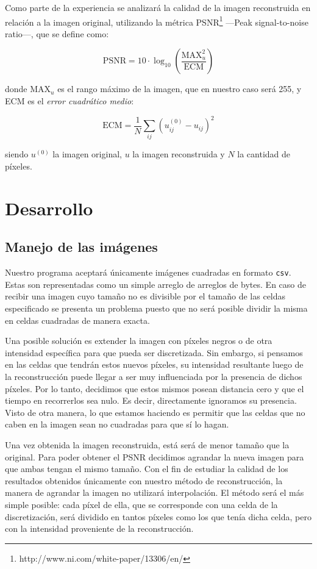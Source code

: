 \documentclass[a4paper]{article}
\begin{document}
Como parte de la experiencia se analizará la calidad de la imagen reconstruida en relación a la imagen original, utilizando la métrica 
PSNR\footnote{http://www.ni.com/white-paper/13306/en/} ---Peak signal-to-noise ratio---, que se define como:

\[
\text{PSNR} = 10\cdot \log_{10}\left(\frac{\text{MAX}_u^2}{\text{ECM}}\right)
\]

\noindent donde $\text{MAX}_u$ es el rango máximo de la imagen, que en nuestro caso será 255, y ECM es el \textit{error cuadrático medio}:

\[
\text{ECM} = \frac{1}{N} \sum_{ij} (u_{ij}^{(0)} - u_{ij})^2
\]

\noindent siendo $u^{(0)}$ la imagen original, $u$ la imagen reconstruida y $N$ la cantidad de píxeles.




\newpage

\section{Desarrollo}

\subsection{Manejo de las imágenes}

Nuestro programa aceptará únicamente imágenes cuadradas en formato \texttt{csv}. Estas son representadas como un simple arreglo de arreglos de bytes. 
En caso de recibir una imagen cuyo tamaño no es divisible por el tamaño de las celdas especificado se presenta un problema puesto que no será posible 
dividir la misma en celdas cuadradas de manera exacta.

Una posible solución es extender la imagen con píxeles negros o de otra intensidad específica para que pueda ser discretizada. Sin embargo, si 
pensamos en las celdas que tendrán estos nuevos píxeles, su intensidad resultante luego de la reconstrucción puede llegar a ser muy influenciada 
por la presencia de dichos píxeles. Por lo tanto, decidimos que estos mismos posean distancia cero y que el tiempo en recorrerlos sea nulo. Es decir, 
directamente ignoramos su presencia. Visto de otra manera, lo que estamos haciendo es permitir que las celdas que no caben en la imagen sean no 
cuadradas para que sí lo hagan.

Una vez obtenida la imagen reconstruida, está será de menor tamaño que la original. Para poder obtener el PSNR decidimos agrandar la nueva imagen para 
que ambas tengan el mismo tamaño. Con el fin de estudiar la calidad de los resultados obtenidos únicamente con nuestro método de reconstrucción, la 
manera de agrandar la imagen no utilizará interpolación. El método será el más simple posible: cada píxel de ella, que se corresponde con una celda de 
la discretización, será dividido en tantos píxeles como los que tenía dicha celda, pero con la intensidad proveniente de la reconstrucción.
\end{document}
